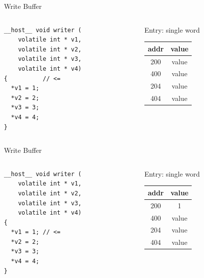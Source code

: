 \documentclass[aspectratio=169,compress]{beamer}
\begin{document}
\begin{frame}[fragile]{Write Buffer}{}
\centering
\begin{columns}[T]
	\begin{column}{0.4\textwidth}
\begin{lstlisting}[]
__host__ void writer (
    volatile int * v1,
    volatile int * v2,
    volatile int * v3,
    volatile int * v4)
{          // <=
  *v1 = 1;
  *v2 = 2;
  *v3 = 3;
  *v4 = 4;
}
\end{lstlisting}
\end{column}
\begin{column}{0.4\textwidth}
	\centering
	Entry: single word
	\begin{table}
		\begin{tabular}{| c | c |}
			\hline 
			addr & value \\
			\hline 
			\textcolor{NordBlack}{200} & \textcolor{NordBlack}{value} \\
			\hline 
			\textcolor{NordBlack}{400} & \textcolor{NordBlack}{value} \\
			\hline 
			\textcolor{NordBlack}{204} & \textcolor{NordBlack}{value} \\
			\hline 
			\textcolor{NordBlack}{404} & \textcolor{NordBlack}{value} \\
			\hline 
		\end{tabular}
	\end{table}
\end{column}
\end{columns}
\end{frame}


\begin{frame}[fragile]{Write Buffer}{}
\centering
\begin{columns}[T]
	\begin{column}{0.4\textwidth}
\begin{lstlisting}[]
__host__ void writer (
    volatile int * v1,
    volatile int * v2,
    volatile int * v3,
    volatile int * v4)
{          
  *v1 = 1; // <=
  *v2 = 2;
  *v3 = 3;
  *v4 = 4;
}
\end{lstlisting}
\end{column}
\begin{column}{0.4\textwidth}
	\centering
	Entry: single word
	\begin{table}
		\begin{tabular}{| c | c |}
			\hline 
			addr & value \\
			\hline 
			200 & 1 \\
			\hline 
			\textcolor{NordBlack}{400} & \textcolor{NordBlack}{value} \\
			\hline 
			\textcolor{NordBlack}{204} & \textcolor{NordBlack}{value} \\
			\hline 
			\textcolor{NordBlack}{404} & \textcolor{NordBlack}{value} \\
			\hline 
		\end{tabular}
	\end{table}
\end{column}
\end{columns}
\end{frame}
\end{document}
